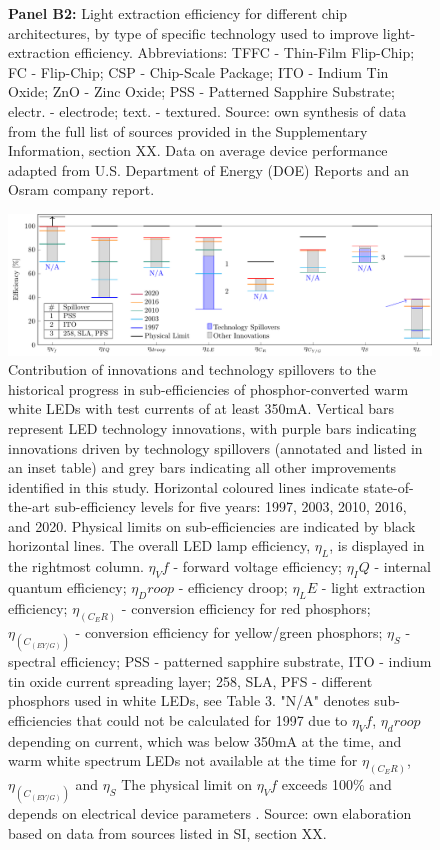 \documentclass[twoside,twocolumn,9pt]{article}
\begin{document}
\begin{figure}[h!]
{ \textbf{Panel B2:} Light extraction efficiency for different chip architectures, by type of specific technology used to improve light-extraction efficiency. Abbreviations: TFFC - Thin-Film Flip-Chip; FC - Flip-Chip; CSP - Chip-Scale Package; ITO - Indium Tin Oxide; ZnO - Zinc Oxide; PSS - Patterned Sapphire Substrate; electr. - electrode; text. - textured.
 Source: own synthesis of data from the full list of sources provided in the Supplementary Information, section XX. Data on average device performance adapted from U.S. Department of Energy (DOE) Reports\cite{doe_ssl_multiyear_2007}\cite{doe_ssl_multiyear_2008}\cite{doe_ssl_multiyear_2013}\cite{doe_ssl_rnd_2016}\cite{doe_ssl_rnd_2018} and an Osram company report\cite{beale_leds_2015}.}
 \label{fgr:subeff}
\end{figure}

\begin{figure}[h!]
 \centering
 \includegraphics[width=\textwidth]{2_SSL_EES/article/figures/breakthroughs_efficiency.pdf}
 \caption{Contribution of innovations and technology spillovers to the historical progress in sub-efficiencies of phosphor-converted warm white LEDs with test currents of at least 350mA. Vertical bars represent LED technology innovations, with purple bars indicating innovations driven by technology spillovers (annotated and listed in an inset table) and grey bars indicating all other improvements identified in this study. Horizontal coloured lines indicate state-of-the-art sub-efficiency levels for five years: 1997, 2003, 2010, 2016, and 2020. Physical limits on sub-efficiencies are indicated by black horizontal lines. The overall LED lamp efficiency, $\eta_L$, is displayed in the rightmost column. $\eta_Vf$ - forward voltage efficiency; $\eta_IQ$ - internal quantum efficiency; $\eta_Droop$ - efficiency droop; $\eta_LE$ - light extraction efficiency; $\eta_(C_ER)$ - conversion efficiency for red phosphors; $\eta_(C_(EY/G))$ - conversion efficiency for yellow/green phosphors; $\eta_S$ - spectral efficiency; PSS - patterned sapphire substrate, ITO - indium tin oxide current spreading layer; 258, SLA, PFS - different phosphors used in white LEDs, see Table 3. "N/A" denotes sub-efficiencies that could not be calculated for 1997 due to $\eta_Vf$, $\eta_droop$ depending on current, which was below 350mA at the time, and warm white spectrum LEDs not available at the time for $\eta_(C_ER)$,$\eta_(C_(EY/G))$  and $\eta_S$ The physical limit on $\eta_Vf$ exceeds 100\% and depends on electrical device parameters \cite{david2016electrical}. Source: own elaboration based on data from sources listed in SI, section XX.}
 \label{fgr:breakthroughs_efficiency}
\end{figure}
\end{document}
